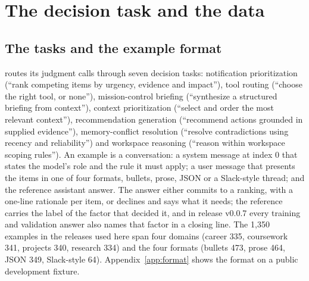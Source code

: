\section{The decision task and the data}\label{sec:data}

\subsection{The tasks and the example format}
\kleos{} routes its judgment calls through seven decision tasks: notification prioritization (``rank competing items by urgency, evidence and impact''), tool routing (``choose the right tool, or none''), mission-control briefing (``synthesize a structured briefing from context''), context prioritization (``select and order the most relevant context''), recommendation generation (``recommend actions grounded in supplied evidence''), memory-conflict resolution (``resolve contradictions using recency and reliability'') and workspace reasoning (``reason within workspace scoping rules''). An example is a conversation: a system message at index 0 that states the model's role and the rule it must apply; a user message that presents the items in one of four formats, bullets, prose, JSON or a Slack-style thread; and the reference assistant answer. The answer either commits to a ranking, with a one-line rationale per item, or declines and says what it needs; the reference carries the label of the factor that decided it, and in release v0.0.7 every training and validation answer also names that factor in a closing line. The 1,350 examples in the releases used here span four domains (career 335, coursework 341, projects 340, research 334) and the four formats (bullets 473, prose 464, JSON 349, Slack-style 64). Appendix~\ref{app:format} shows the format on a public development fixture.


